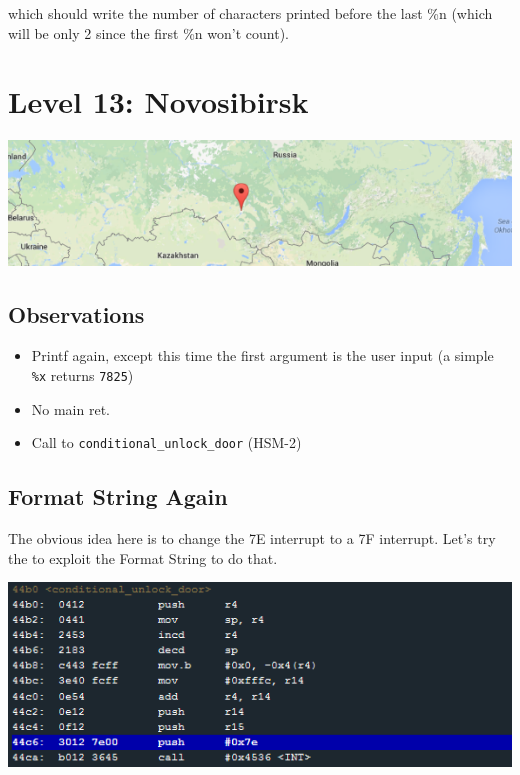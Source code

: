 \documentclass[a4paper,11pt]{article}
\begin{document}
which should write the number of characters printed before the last \%n
(which will be only 2 since the first \%n won't count).

\section{Level 13: Novosibirsk}\label{level-13-novosibirsk}

\includegraphics{img/13_1.PNG}

\subsection{Observations}\label{observations-5}

\begin{itemize}
\itemsep1pt\parskip0pt
\item
  Printf again, except this time the first argument is the user input (a
  simple \texttt{\%x} returns \texttt{7825})
\item
  No main ret.
\item
  Call to \texttt{conditional\_unlock\_door} (HSM-2)
\end{itemize}

\subsection{Format String Again}\label{format-string-again}

The obvious idea here is to change the 7E interrupt to a 7F interrupt.
Let's try the to exploit the Format String to do that.

\includegraphics{img/13_2.PNG}
\end{document}
